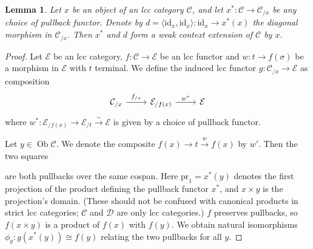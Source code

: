 \documentclass[a4paper]{article}
\newtheorem{lemma}[theorem]{Lemma}
\theoremstyle{remark}
\theoremstyle{definition}
\begin{document}
\begin{lemma}
  \label{lem:slice-is-weak-ext}
  Let $x$ be an object of an lcc category $\mathcal{C}$, and let $x^* : \mathcal{C} \rightarrow \mathcal{C}_{/ x}$ be any choice of pullback functor.
  Denote by $d = \langle \mathrm{id}_x, \mathrm{id}_x \rangle : \mathrm{id}_x \rightarrow x^*(x)$ the diagonal morphism in $\mathcal{C}_{/ x}$.
  Then $x^*$ and $d$ form a weak context extension of $\mathcal{C}$ by $x$.
\end{lemma}
\begin{proof}
  Let $\mathcal{E}$ be an lcc category, $f : \mathcal{C} \rightarrow \mathcal{E}$ be an lcc functor and $w : t \rightarrow f(\sigma)$ be a morphism in $\mathcal{E}$ with $t$ terminal.
  We define the induced lcc functor $g : \mathcal{C}_{/ x} \rightarrow \mathcal{E}$ as composition
  \begin{equation}
    \begin{tikzcd}
      \mathcal{C}_{/ x} \arrow[r, "f_{/ x}"] & \mathcal{E}_{/ f(x)} \arrow[r, "w^*"] & \mathcal{E}
    \end{tikzcd}
  \end{equation}
  where $w^* : \mathcal{E}_{ / f(x)} \rightarrow \mathcal{E}_{/ t} \xrightarrow{\sim} \mathcal{E}$ is given by a choice of pullback functor.

  Let $y \in \operatorname{Ob} \mathcal{C}$.
  We denote the composite $f(x) \rightarrow t \xrightarrow{w} f(x)$ by $w'$.
  Then the two squares
  are both pullbacks over the same cospan.
  Here $\mathrm{pr}_1 = x^*(y)$ denotes the first projection of the product defining the pullback functor $x^*$, and $x \times y$ is the projection's domain.
  (These should not be confused with canonical products in strict lcc categories; $\mathcal{C}$ and $\mathcal{D}$ are only lcc categories.)
  $f$ preserves pullbacks, so $f(x \times y)$ is a product of $f(x)$ with $f(y)$.
  We obtain natural isomorphisms $\phi_y : g(x^*(y)) \cong f(y)$ relating the two pullbacks for all $y$.


\end{proof}
\end{document}
